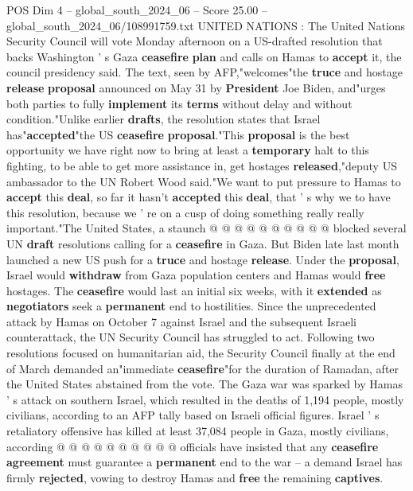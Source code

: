 \begin{textsample}{POS Dim 4 – global\_south\_2024\_06 – Score 25.00 – global\_south\_2024\_06/108991759.txt}  \label{ex:f4_pos_085}
UNITED NATIONS : The United Nations Security Council will vote Monday afternoon on a US-drafted resolution that backs Washington ' s Gaza \textbf{ceasefire} \textbf{plan} and calls on Hamas to \textbf{accept} it, the council presidency said.
The text, seen by AFP,"welcomes"the \textbf{truce} and hostage \textbf{release} \textbf{proposal} announced on May 31 by \textbf{President} Joe Biden, and"urges both parties to fully \textbf{implement} its \textbf{terms} without delay and without condition."Unlike earlier \textbf{drafts}, the resolution states that Israel has"\textbf{accepted}"the US \textbf{ceasefire} \textbf{proposal}."This \textbf{proposal} is the best opportunity we have right now to bring at least a \textbf{temporary} halt to this fighting, to be able to get more assistance in, get hostages \textbf{released},"deputy US ambassador to the UN Robert Wood said."We want to put pressure to Hamas to \textbf{accept} this \textbf{deal}, so far it hasn't \textbf{accepted} this \textbf{deal}, that ' s why we to have this resolution, because we ' re on a cusp of doing something really really important."The United States, a staunch @ @ @ @ @ @ @ @ @ @ blocked several UN \textbf{draft} resolutions calling for a \textbf{ceasefire} in Gaza.
But Biden late last month launched a new US push for a \textbf{truce} and hostage \textbf{release}.
Under the \textbf{proposal}, Israel would \textbf{withdraw} from Gaza population centers and Hamas would \textbf{free} hostages.
The \textbf{ceasefire} would last an initial six weeks, with it \textbf{extended} as \textbf{negotiators} seek a \textbf{permanent} end to hostilities.
Since the unprecedented attack by Hamas on October 7 against Israel and the subsequent Israeli counterattack, the UN Security Council has struggled to act.
Following two resolutions focused on humanitarian aid, the Security Council finally at the end of March demanded an"immediate \textbf{ceasefire}"for the duration of Ramadan, after the United States abstained from the vote.
The Gaza war was sparked by Hamas ' s attack on southern Israel, which resulted in the deaths of 1,194 people, mostly civilians, according to an AFP tally based on Israeli official figures.
Israel ' s retaliatory offensive has killed at least 37,084 people in Gaza, mostly civilians, according @ @ @ @ @ @ @ @ @ @ officials have insisted that any \textbf{ceasefire} \textbf{agreement} must guarantee a \textbf{permanent} end to the war -- a demand Israel has firmly \textbf{rejected}, vowing to destroy Hamas and \textbf{free} the remaining \textbf{captives}.

\end{textsample}
